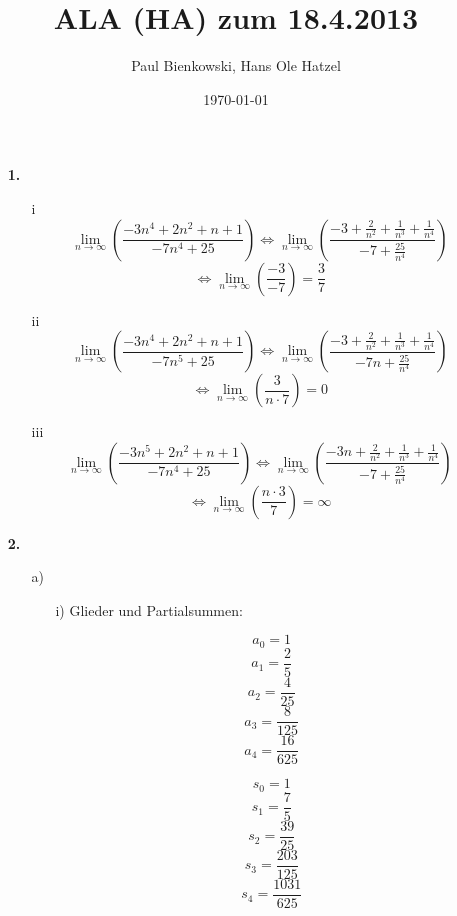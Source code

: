 \documentclass[a4paper]{scrartcl}
\author{Paul Bienkowski, Hans Ole Hatzel}
\title{ALA (HA) zum 18.4.2013}
\date{\today}
\begin{document}
\setcounter{secnumdepth}{0}
\maketitle

\begin{enumerate}
    \item[\textbf{1.}]
        \begin{enumerate}
            \item[i]
                $$\lim\limits_{n \rightarrow \infty}{\left(\frac{-3n^4+2n^2+n+1}{-7n^4+25}\right)} \Leftrightarrow\lim\limits_{n \rightarrow \infty}{\left(\frac{-3+\frac{2}{n^2}+\frac{1}{n^3}+\frac{1}{n^4}}{-7+\frac{25}{n^4}}\right)}$$ 
                $$\Leftrightarrow\lim\limits_{n \rightarrow \infty}{\left(\frac{-3}{-7}\right)}=\frac{3}{7}$$
            \item[ii]
                $$\lim\limits_{n \rightarrow \infty}{\left(\frac{-3n^4+2n^2+n+1}{-7n^5+25}\right)} \Leftrightarrow\lim\limits_{n \rightarrow \infty}{\left(\frac{-3+\frac{2}{n^2}+\frac{1}{n^3}+\frac{1}{n^4}}{-7n+\frac{25}{n^4}}\right)}$$ 
                $$\Leftrightarrow\lim\limits_{n \rightarrow \infty}{\left(\frac{3}{n \cdot 7}\right)}=0$$
            \item[iii]
                $$\lim\limits_{n \rightarrow \infty}{\left(\frac{-3n^5+2n^2+n+1}{-7n^4+25}\right)} \Leftrightarrow\lim\limits_{n \rightarrow \infty}{\left(\frac{-3n+\frac{2}{n^2}+\frac{1}{n^3}+\frac{1}{n^4}}{-7+\frac{25}{n^4}}\right)}$$ 
                $$\Leftrightarrow\lim\limits_{n \rightarrow \infty}{\left(\frac{n \cdot 3}{7}\right)}=\infty$$ 
        \end{enumerate}                             
    \item[\textbf{2.}]
        \begin{enumerate}
            \item[a)]
            \begin{enumerate}
                \item[i)]
                    Glieder und Partialsummen:

                    \begin{minipage}[b]{0.3\textwidth}
                    $$a_0 = 1$$
                    $$a_1 = \frac{2}{5}$$
                    $$a_2 = \frac{4}{25}$$
                    $$a_3 = \frac{8}{125}$$
                    $$a_4 = \frac{16}{625}$$
                    \end{minipage}
                    \begin{minipage}[b]{0.3\textwidth}
                    $$s_0 = 1$$
                    $$s_1 = \frac{7}{5}$$
                    $$s_2 = \frac{39}{25}$$
                    $$s_3 = \frac{203}{125}$$
                    $$s_4 = \frac{1031}{625}$$
                    \end{minipage}
                    

\end{enumerate}
\end{enumerate}
\end{enumerate}
\end{document}
